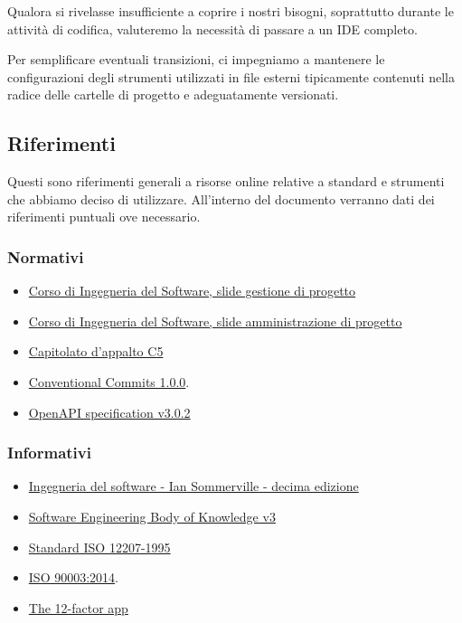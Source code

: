 \documentclass[../norme-di-progetto.tex]{subfiles}
\begin{document}
Qualora si rivelasse insufficiente a coprire i nostri bisogni, soprattutto durante le attività di codifica, valuteremo la necessità di passare a un IDE completo.

Per semplificare eventuali transizioni, ci impegniamo a mantenere le configurazioni degli strumenti utilizzati in file esterni tipicamente contenuti nella radice delle cartelle di progetto e adeguatamente versionati.

\subsection{Riferimenti}%
\label{sub:riferimenti}

Questi sono riferimenti generali a risorse online relative a standard e strumenti che abbiamo deciso di utilizzare.
All'interno del documento verranno dati dei riferimenti puntuali ove necessario.

\subsubsection{Normativi}%
\label{subs:riferimenti/normativi}

\begin{itemize}
  \item \href{https://www.math.unipd.it/~tullio/IS-1/2019/Dispense/L06.pdf}{Corso di Ingegneria del Software, slide gestione di progetto}
  \item \href{https://www.math.unipd.it/~tullio/IS-1/2019/Dispense/FC01.pdf}{Corso di Ingegneria del Software, slide amministrazione di progetto}
  \item \href{https://www.math.unipd.it/~tullio/IS-1/2019/Progetto/C5.pdf}{Capitolato d'appalto C5}
  \item \href{https://www.conventionalcommits.org/en/v1.0.0/}{Conventional Commits 1.0.0}.
  \item \href{https://spec.openapis.org/oas/v3.0.2}{OpenAPI specification v3.0.2}
\end{itemize}

\subsubsection{Informativi}%
\label{subs:riferimenti/informativi}

\begin{itemize}
  \item \href{https://www.pearson.it/opera/pearson/0-6424-ingegneria_del_software}{Ingegneria del software - Ian Sommerville - decima edizione}
  \item \href{https://www.computer.org/education/bodies-of-knowledge/software-engineering/v3}{Software Engineering Body of Knowledge v3}
  \item \href{https://www.math.unipd.it/~tullio/IS-1/2009/Approfondimenti/ISO_12207-1995.pdf}{Standard ISO 12207-1995}
  \item \href{https://www.iso.org/standard/66240.html}{ISO 90003:2014}.
  \item \href{https://12factor.net/}{The 12-factor app}
\end{itemize}
\end{document}
